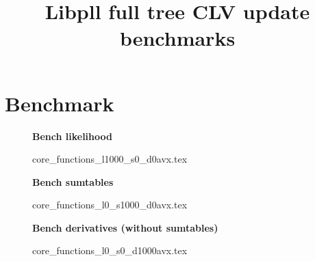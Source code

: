 \documentclass[a4paper]{article}
\begin{document}
\newcommand*{\figuretitle}[1]{%
    {\centering%
    \textbf{#1}%
    \par\medskip}%
}


\title{Libpll full tree CLV update benchmarks}
\maketitle



\section{Benchmark}


\begin{figure}[!htb]
\figuretitle{Bench likelihood}
{core_functions_l1000_s0_d0avx.tex}
\end{figure}

\begin{figure}[!htb]
\figuretitle{Bench sumtables}
{core_functions_l0_s1000_d0avx.tex}
\end{figure}


\begin{figure}[!htb]
\figuretitle{Bench derivatives (without sumtables)}
{core_functions_l0_s0_d1000avx.tex}
\end{figure}
\end{document}
